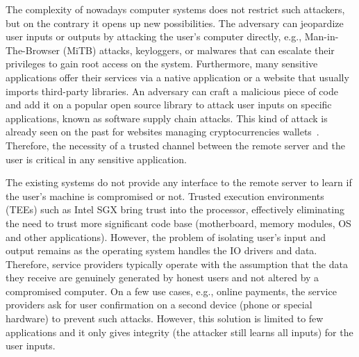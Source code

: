 The complexity of nowadays computer systems does not restrict such attackers, but on the contrary it opens up new possibilities. The adversary can jeopardize user inputs or outputs by attacking the user's computer directly, e.g., Man-in-The-Browser (MiTB) attacks, keyloggers, or malwares that can escalate their privileges to gain root access on the system. Furthermore, many sensitive applications offer their services via a native application or a website that usually imports third-party libraries. An adversary can craft a malicious piece of code and add it on a popular open source library to attack user inputs on specific applications, known as software supply chain attacks. This kind of attack is already seen on the past for websites managing cryptocurrencies wallets~\cite{softSupplyChainAttack, jsSupplyChainAttack}. Therefore, the necessity of a trusted channel between the remote server and the user is critical in any sensitive application.


The existing systems do not provide any interface to the remote server to learn if the user's machine is compromised or not. Trusted execution environments (TEEs) such as Intel SGX bring trust into the processor, effectively eliminating the need to trust more significant code base (motherboard, memory modules, OS and other applications). However, the problem of isolating user's input and output remains as the operating system handles the IO drivers and data. Therefore, service providers typically operate with the assumption that the data they receive are genuinely generated by honest users and not altered by a compromised computer. On a few use cases, e.g., online payments, the service providers ask for user confirmation on a second device (phone or special hardware) to prevent such attacks. However, this solution is limited to few applications and it only gives integrity (the attacker still learns all inputs) for the user inputs. 

